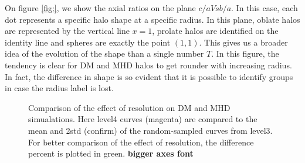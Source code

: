 On figure \ref{fig:}, we show the axial ratios on the plane $c/a Vs b/a$. In this case, each dot represents a specific halo shape at a specific radius. In this plane, oblate halos are represented by the vertical line $x = 1$, prolate halos are identified on the identity line and spheres are exactly the point $(1,1)$. This gives us a broader idea of the evolution of the shape than a single number $T$. In this figure, the tendency is clear for DM and MHD halos to get rounder with increasing radius. In fact, the difference in shape is so evident that it is possible to identify groups in case the radius label is lost.\\

\begin{figure}[!ht]
  \centering
  \hfill
  \caption{Comparison of the effect of resolution on DM and MHD simualations. Here level4 curves (magenta) are compared to the mean and 2std (confirm) of the random-sampled curves from level3. For better comparison of the effect of resolution, the difference percent is plotted in green.  \textbf{bigger axes font}}
\end{figure}

